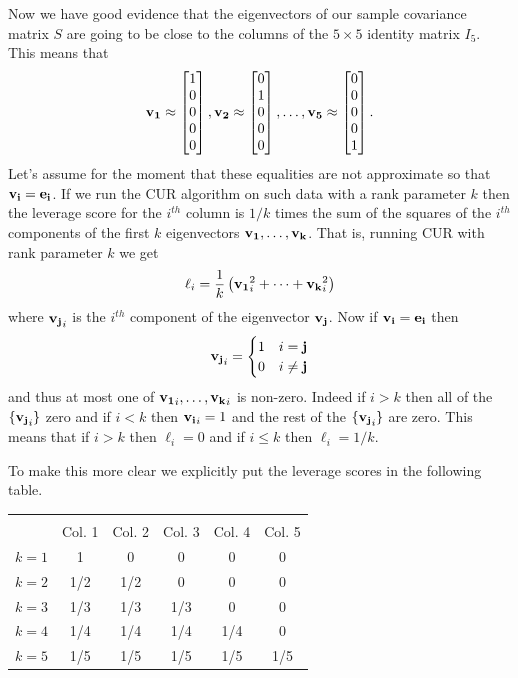 \documentclass{book}
\begin{document}
Now we have good evidence that the eigenvectors of our sample covariance matrix $S$ are going to be close to the columns of the $5 \times 5$ identity matrix $I_5$. This means that 
$$
{\bf v_1}\approx\begin{bmatrix}1\\0\\0\\0\\0\end{bmatrix},{\bf v_2}\approx\begin{bmatrix}0\\1\\0\\0\\0\end{bmatrix},\ldots,{\bf v_5}\approx\begin{bmatrix}0\\0\\0\\0\\1\end{bmatrix}.
$$
Let's assume for the moment that these equalities are not approximate so that ${\bf v_i}={\bf e_i}$. If we run the CUR algorithm on such data with a rank parameter $k$ then the leverage score for the $i^{th}$ column is $1/k$ times the sum of the squares of the $i^{th}$ components of the first $k$ eigenvectors ${\bf v_1},\ldots,{\bf v_k}$. That is, running CUR with rank parameter $k$ we get
$$
\ell_i=\frac{1}{k}\left({\bf v_1}_i^2+\cdots+{\bf v_k}^2_i\right)
$$
where ${\bf v_j}_i$ is the $i^{th}$ component of the eigenvector ${\bf v_j}$. Now if ${\bf v_i}={\bf e_i}$ then 
$$
{\bf v_j}_i=
\begin{cases}
1& i={\bf j}\\
0& i \neq {\bf j}
\end{cases}
$$
and thus at most one of ${\bf v_1}_i,\ldots,{\bf v_k}_i$ is non-zero. Indeed if $i>k$ then all of the $\{{\bf v_j}_i\}$ zero and if $i<k$ then ${\bf v_i}_i=1$ and the rest of the $\{{\bf v_j}_i\}$ are zero. This means that if $i>k$ then $\ell_i=0$ and if $i\leq k$ then $\ell_i=1/k$.



To make this more clear we explicitly put the leverage scores in the following table.

\begin{center}
\begin{tabular}{|c||c|c|c|c|c|}
\hline&&&&&\\\text{}& Col. 1& Col. 2& Col. 3& Col. 4& Col. 5\\\hline\hline
$k=1$& 1& 0& 0& 0& 0\\\hline
$k=2$& 1/2& 1/2& 0& 0& 0\\\hline
$k=3$& 1/3& 1/3& 1/3& 0& 0\\\hline
$k=4$& 1/4& 1/4& 1/4& 1/4& 0\\\hline
$k=5$& 1/5& 1/5& 1/5& 1/5& 1/5\\\hline
\end{tabular}
\end{center}
\end{document}
